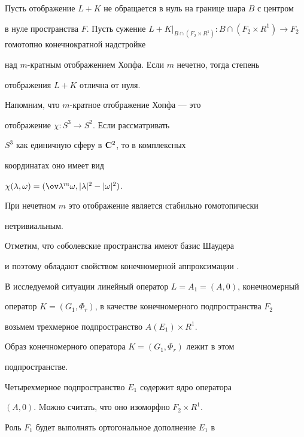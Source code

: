 \begin{thm}\label{deg}


Пусть отображение $L+K$ не обращается в нуль на границе шара $B$ с центром 


в нуле пространства $F$. Пусть сужение $L+K\vert_{B\cap (F_2\times R^1)}


: {B\cap (F_2\times R^1)}\to F_2$ гомотопно конечнократной надстройке


над $m$-кратным отображением Хопфа. Если $m$ нечетно, тогда степень


отображения $L+K$ отлична от нуля.


\end{thm}





Напомним, что $m$-кратное отображение Хопфа --- это


отображение $\chi : S^3 \to S^2$. Если рассматривать


$S^3$ как единичную сферу в $\bold C ^2$, то в комплексных


координатах оно имеет вид


$\chi (\l ,\omega)=(\ov \l^m \omega,|\l |^2-|\omega |^2)$.


При нечетном $m$ это отображение является стабильно гомотопически


нетривиальным.





Отметим, что cоболевские пространства имеют базис Шаудера \cite{tribel}


и поэтому обладают свойством конечномерной аппроксимации \cite{lind}.





В исследуемой ситуации линейный оператор $L=A_1=(A,0)$, конечномерный


оператор $K=(G_1,\Phi_r)$, в качестве конечномерного подпространства $F_2$


возьмем трехмерное подпространство $A(E_1)\times R^1$.


Образ конечномерного оператора $K=(G_1,\Phi_r)$ лежит в этом


подпространстве.


Четырехмерное подпространство $E_1$ содержит ядро оператора


$(A,0)$. Mожно считать, что оно изоморфно $F_2\times R^1$.


Роль $F_1$ будет выполнять ортогональное дополнение $E_1$ в 


